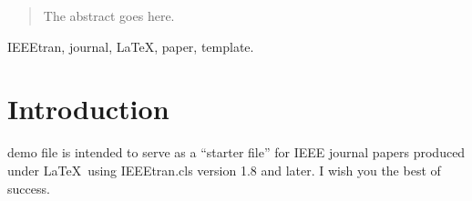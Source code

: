 \documentclass[journal]{IEEEtran}
\begin{document}




\maketitle

\begin{abstract}
The abstract goes here.
\end{abstract}

\begin{IEEEkeywords}
IEEEtran, journal, \LaTeX, paper, template.
\end{IEEEkeywords}






%
\IEEEpeerreviewmaketitle



\section{Introduction}
% 
% 
% 
% 
 demo file is intended to serve as a ``starter file''
for IEEE journal papers produced under \LaTeX\ using
IEEEtran.cls version 1.8 and later.
I wish you the best of success.
\end{document}
